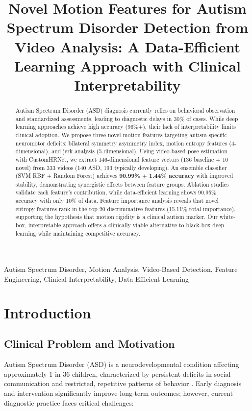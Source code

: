 \documentclass[conference]{IEEEtran}
\title{Novel Motion Features for Autism Spectrum Disorder Detection from Video Analysis: A Data-Efficient Learning Approach with Clinical Interpretability}
\author{\IEEEauthorblockN{Anonymous}
\IEEEauthorblockA{Department of Computer Science,\\
Institution Name, Country}
}
\begin{document}
\maketitle

\begin{abstract}
Autism Spectrum Disorder (ASD) diagnosis currently relies on behavioral observation and standardized assessments, leading to diagnostic delays in 30\% of cases. While deep learning approaches achieve high accuracy (96\%+), their lack of interpretability limits clinical adoption. We propose three novel motion features targeting autism-specific neuromotor deficits: bilateral symmetry asymmetry index, motion entropy features (4-dimensional), and jerk analysis (5-dimensional). Using video-based pose estimation with CustomHRNet, we extract 146-dimensional feature vectors (136 baseline + 10 novel) from 333 videos (140 ASD, 193 typically developing). An ensemble classifier (SVM RBF + Random Forest) achieves \textbf{90.99\% $\pm$ 1.44\% accuracy} with improved stability, demonstrating synergistic effects between feature groups. Ablation studies validate each feature's contribution, while data-efficient learning shows 90.95\% accuracy with only 10\% of data. Feature importance analysis reveals that novel entropy features rank in the top 20 discriminative features (15.11\% total importance), supporting the hypothesis that motion rigidity is a clinical autism marker. Our white-box, interpretable approach offers a clinically viable alternative to black-box deep learning while maintaining competitive accuracy.
\end{abstract}

\begin{IEEEkeywords}
Autism Spectrum Disorder, Motion Analysis, Video-Based Detection, Feature Engineering, Clinical Interpretability, Data-Efficient Learning
\end{IEEEkeywords}

\section{Introduction}

\subsection{Clinical Problem and Motivation}

Autism Spectrum Disorder (ASD) is a neurodevelopmental condition affecting approximately 1 in 36 children, characterized by persistent deficits in social communication and restricted, repetitive patterns of behavior \cite{dsm5}. Early diagnosis and intervention significantly improve long-term outcomes; however, current diagnostic practice faces critical challenges:
\end{document}
